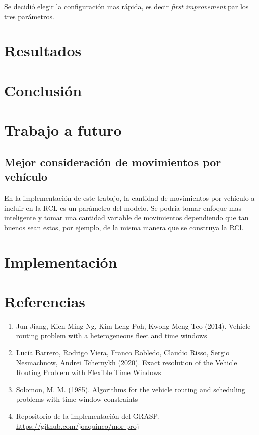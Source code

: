 \documentclass{article}
\begin{document}
  Se decidió elegir la configuración mas rápida, es decir {\it first improvement} par los tres parámetros.

  \section*{Resultados}

  \section*{Conclusión}

  \section*{Trabajo a futuro}

  \subsection*{Mejor consideración de movimientos por vehículo}
  
  En la implementación de este trabajo, la cantidad de movimientos por vehículo a incluir en la RCL es un parámetro del modelo. Se podría tomar enfoque mas inteligente y tomar una cantidad variable de movimientos dependiendo que tan buenos sean estos, por ejemplo, de la misma manera que se construya la RCl.

  \section*{Implementación}

  \section*{Referencias}

  \begin{enumerate}
    \item{\label{jiang} Jun Jiang, Kien Ming Ng, Kim Leng Poh, Kwong Meng Teo (2014). Vehicle routing problem with a heterogeneous fleet and time windows}
    \item{\label{inco} Lucía Barrero, Rodrigo Viera, Franco Robledo, Claudio Risso, Sergio Nesmachnow, Andrei Tchernykh (2020). Exact resolution of the Vehicle Routing Problem with Flexible Time Windows}
    \item{\label{solomon} Solomon, M. M. (1985). Algorithms for the vehicle routing and scheduling problems with time window constraints}
    \item{\label{repo} Repositorio de la implementación del GRASP. \url{https://github.com/joaquinco/mor-proj}}
  \end{enumerate}
\end{document}
